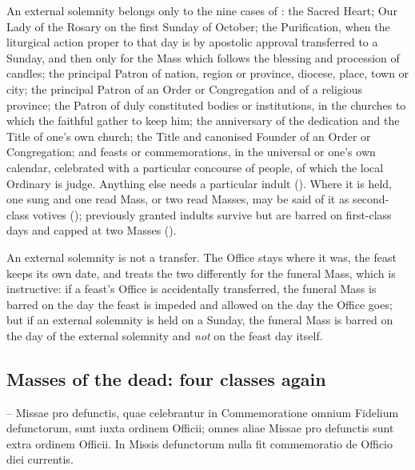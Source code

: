 An external solemnity belongs  only to the nine cases of
: the Sacred Heart; Our Lady of the Rosary on the first Sunday of
October; the Purification, when the liturgical action proper to that day is by
apostolic approval transferred to a Sunday, and then only for the Mass which
follows the blessing and procession of candles; the principal Patron of
nation, region or province, diocese, place, town or city; the principal Patron
of an Order or Congregation and of a religious province; the Patron of duly
constituted bodies or institutions, in the churches to which the faithful
gather to keep him; the anniversary of the dedication and the Title of one's
own church; the Title and canonised Founder of an Order or Congregation; and
feasts or commemorations, in the universal or one's own calendar, celebrated
with a particular concourse of people, of which the local Ordinary is judge.
Anything else needs a particular indult (). Where it is held, one
sung and one read Mass, or two read Masses, may be said of it as second-class
votives (); previously granted indults survive but are barred on
first-class days and capped at two Masses ().

An external solemnity is not a transfer. The Office stays where it was, the
feast keeps its own date, and  treats the two differently for the
funeral Mass, which is instructive: if a feast's Office is accidentally
transferred, the funeral Mass is barred on the day the feast is impeded and
allowed on the day the Office goes; but if an external solemnity is held on a
Sunday, the funeral Mass is barred on the day of the external solemnity and
\emph{not} on the feast day itself.

\subsection{Masses of the dead: four classes again}

\begin{rulebox}{--}
Missae pro defunctis, quae celebrantur in Commemoratione omnium Fidelium
defunctorum, sunt iuxta ordinem Officii; omnes aliae Missae pro defunctis sunt
extra ordinem Officii. In Missis defunctorum nulla fit commemoratio de Officio
diei currentis.
\end{rulebox}

